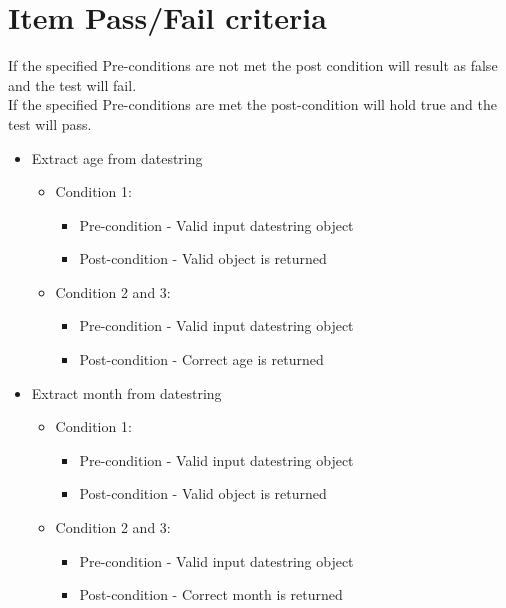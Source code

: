 \documentclass{article}
\begin{document}
\section{Item Pass/Fail criteria}\label{sec:FailPass}
If the specified Pre-conditions are not met the post condition will result as false and the test will fail. \\
If the specified Pre-conditions are met the post-condition will hold true and the test will pass.
\begin{itemize}
\item Extract age from datestring
\begin{itemize}
	\item Condition 1:
	\begin{itemize}
		\item Pre-condition - Valid input datestring object
		\item Post-condition - Valid object is returned
	\end{itemize}
	\item Condition 2 and 3:
	\begin{itemize}
		\item Pre-condition - Valid input datestring object
		\item Post-condition - Correct age is returned
	\end{itemize}

\end{itemize}
\item Extract month from datestring
\begin{itemize}
	\item Condition 1:
	\begin{itemize}
		\item Pre-condition - Valid input datestring object
		\item Post-condition - Valid object is returned
	\end{itemize}
	\item Condition 2 and 3:
	\begin{itemize}
		\item Pre-condition - Valid input datestring object
		\item Post-condition - Correct month is returned
	\end{itemize}

\end{itemize}


\end{itemize}
\end{document}
